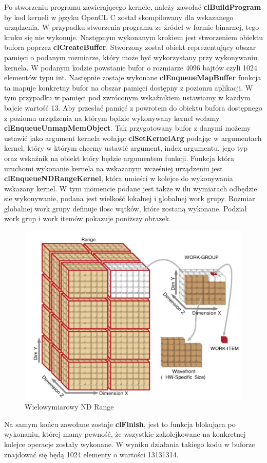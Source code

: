 Po stworzeniu programu zawierającego kernele, należy zawołać \textbf{clBuildProgram} by kod kerneli w języku OpenCL C został skompilowany dla wskazanego urządzenia. W przypadku stworzenia programu ze źródeł w formie binarnej, tego kroku się nie wykonuje.
Następnym wykonanym krokiem jest stworzeniem obiektu bufora poprzez \textbf{clCreateBuffer}. Stworzony został obiekt reprezentujący obszar pamięci o podanym rozmiarze, który może być wykorzystany przy wykonywaniu kernela. W podanym kodzie powstanie bufor o rozmiarze 4096 bajtów czyli 1024 elementów typu int.
Następnie zostaje wykonane \textbf{clEnqueueMapBuffer} funkcja ta mapuje konkretny bufor na obszar pamięci dostępny z poziomu aplikacji. W tym przypadku w pamięci pod zwróconym wskaźnikiem ustawiamy w każdym bajcie wartość 13.
Aby przesłać pamięć z powrotem do obiektu bufora dostępnego z poziomu urządzenia na którym będzie wykonywany kernel wołamy \textbf{clEnqueueUnmapMemObject}.
Tak przygotowany bufor z danymi możemy ustawić jako argument kernela wołając \textbf{clSetKernelArg} podając w argumentach kernel, który w którym chcemy ustawić argument, index argumentu, jego typ oraz wskaźnik na obiekt który będzie argumentem funkcji.
Funkcja która uruchomi wykonanie kernela na wskazanym wcześniej urządzeniu jest \textbf{clEnqueueNDRangeKernel}, która umieści w kolejce do wykonywania wskazany kernel. W tym momencie podane jest także w ilu wymiarach odbędzie sie wykonywanie, podana jest wielkość lokalnej i globalnej work grupy. Rozmiar globalnej work grupy definuje ilosc wątków, które zostaną wykonane. Podział work grup i work itemów pokazuje poniższy obrazek.
\begin{figure}[H]
	\includegraphics[scale=0.4]{imgs/WorkDims.jpg}
	\caption{Wielowymiarowy ND Range \cite{OpenCLProgramingGuide}}
\end{figure}
Na samym końcu zawołane zostaje \textbf{clFinish}, jest to funkcja blokująca po wykonaniu, której mamy pewność, że wszystkie zakolejkowane na konkretnej kolejce operacje zostały wykonane.
W wyniku działania takiego kodu w buforze znajdować się będą 1024 elementy o wartości 13131314.
